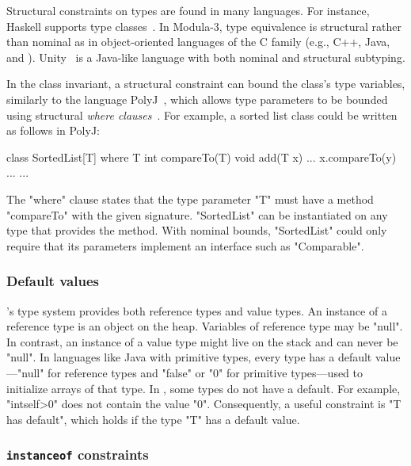 Structural constraints on types are found in many languages.
For instance,
Haskell supports type
classes~\cite{haskell,haskell-type-classes}.
%
In Modula-3, type equivalence is structural
rather than nominal as in object-oriented languages of the C
family (e.g., C++, Java, and \Xten{}).
Unity~\cite{malayeriIntegrating08}
is a Java-like language with both nominal and structural subtyping.

In the class invariant, a structural constraint can bound the
class's type variables, similarly to 
the language PolyJ~\cite{java-popl97}, which allows type
parameters to be
bounded using
structural \emph{where clauses}~\cite{where-clauses}.
For example, a sorted list class
could be written as follows in PolyJ:
{
\begin{xtennoindent}
class SortedList[T] where T {int compareTo(T)} {
  void add(T x) {... x.compareTo(y) ...}
  ...
}
\end{xtennoindent}}
The \xcd"where" clause states that the type parameter
\xcd"T" must have a
method \xcd"compareTo" with the given signature.
\xcd"SortedList" can be instantiated on any type
that provides the method.
With nominal bounds, \xcd"SortedList" could only require that
its parameters implement an interface such as \xcd"Comparable".

\subsubsection{Default values}

\Xten's type system provides both reference types and value
types.  An instance of a reference type is an object on the
heap.  Variables of reference type may be \xcd"null".
In contrast, an instance of a value type might live on the stack
and can never be \xcd"null".  In languages like Java with
primitive types, every type has a default value---\xcd"null" for
reference types and \xcd"false" or \xcd"0" for primitive
types---used to initialize arrays of that type.
In \Xten, some types do not have a default.  For example,
\xcd"int{self>0}" does not contain the value \xcd"0".
Consequently, a useful constraint is \xcd"T has default", which
holds if the type \xcd"T" has a default value.

\subsubsection{{\tt instanceof} constraints}

